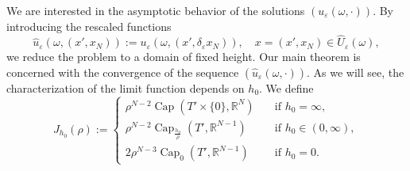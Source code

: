 \documentclass{article}
\numberwithin{equation}{section}
\theoremstyle{definition}
\theoremstyle{remark}
\newcommand{\cpct}{\operatorname{Cap}}
\begin{document}
We are interested in the asymptotic behavior of the solutions $(u_\varepsilon(\omega, \cdot))$. By introducing the rescaled functions
\begin{equation} \label{eq:rescaled_solutions}
    \hat{u}_\varepsilon(\omega, (x', x_N)) := u_\varepsilon(\omega, (x', \delta_\varepsilon x_N)), \quad x = (x', x_N) \in \hat{U}_\varepsilon(\omega),
\end{equation}
we reduce the problem to a domain of fixed height. Our main theorem is concerned with the convergence of the sequence $(\hat{u}_\varepsilon(\omega, \cdot))$. As we will see, the characterization of the limit function depends on $h_0$. We define
\begin{equation*}
    J_{h_0}(\rho) :=
    \begin{cases}
        \rho^{N - 2} \cpct(T' \times \{0\}, \mathbb{R}^N) \quad &\text{if } h_0 = \infty, \\
        \rho^{N - 2} \cpct_\frac{h_0}{\rho}(T', \mathbb{R}^{N - 1}) \quad &\text{if } h_0 \in (0, \infty), \\
        2 \rho^{N - 3} \cpct_0(T', \mathbb{R}^{N - 1}) \quad &\text{if } h_0 = 0.
    \end{cases}
\end{equation*}
\end{document}
